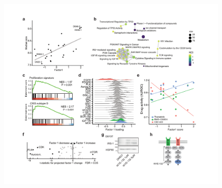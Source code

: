 \begin{flushleft}
\begin{figure}[h]
\centering
\includegraphics[width=\textwidth,
                height=\textheight,
                keepaspectratio]{figures/promise/pdf/fig_6_1.pdf}
\caption{}
\label{fig_261}
\end{figure}
\bigbreak


\end{flushleft}
